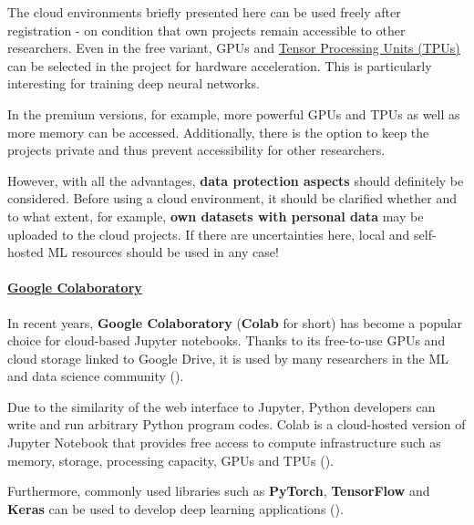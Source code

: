 \documentclass [oneside,10pt,a4paper,ngerman,BCOR10mm,headsepline,parindent,final]{scrartcl}
\begin{document}
The cloud environments briefly presented here can be used freely after
registration - on condition that own projects remain accessible to other
researchers. Even in the free variant, GPUs and
\href{https://en.wikipedia.org/wiki/Tensor_Processing_Unit}{Tensor
Processing Units (TPUs)} can be selected in the project for hardware
acceleration. This is particularly interesting for training deep neural
networks.

In the premium versions, for example, more powerful GPUs and TPUs as
well as more memory can be accessed. Additionally, there is the option
to keep the projects private and thus prevent accessibility for other
researchers.

However, with all the advantages, \textbf{data protection aspects}
should definitely be considered. Before using a cloud environment, it
should be clarified whether and to what extent, for example, \textbf{own
datasets with personal data} may be uploaded to the cloud projects. If
there are uncertainties here, local and self-hosted ML resources should
be used in any case!

    \hypertarget{google-colaboratory}{%
\paragraph{\texorpdfstring{\href{https://colab.research.google.com/}{Google
Colaboratory}}{Google Colaboratory}}\label{google-colaboratory}}

In recent years, \textbf{Google Colaboratory} (\textbf{Colab} for short)
has become a popular choice for cloud-based Jupyter notebooks. Thanks to
its free-to-use GPUs and cloud storage linked to Google Drive, it is
used by many researchers in the ML and data science community
(\cite{Colab_Alternatives_2021}).

Due to the similarity of the web interface to Jupyter, Python developers
can write and run arbitrary Python program codes. Colab is a
cloud-hosted version of Jupyter Notebook that provides free access to
compute infrastructure such as memory, storage, processing capacity,
GPUs and TPUs (\cite{Colab_about_2022}).

Furthermore, commonly used libraries such as \textbf{PyTorch},
\textbf{TensorFlow} and \textbf{Keras} can be used to develop deep
learning applications (\cite{Colab_5_Alternatives_2021}).
\end{document}
